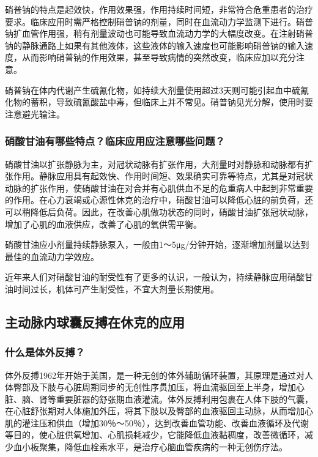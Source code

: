 硝普钠的特点是起效快，作用效果强，作用持续时间短，非常符合危重患者的治疗要求。临床应用时需严格控制硝普钠的剂量，同时在血流动力学监测下进行。硝普钠扩血管作用强，稍有剂量波动也可能导致血流动力学的大幅度改变。在注射硝普钠的静脉通路上如果有其他液体，这些液体的输入速度也可能影响硝普钠的输入速度，从而影响硝普钠的作用效果，甚至导致病情的突然改变，临床应加以充分注意。

硝普钠在体内代谢产生硫氰化物，如持续大剂量使用超过3天则可能引起血中硫氰化物的蓄积，导致硫氰酸盐中毒，但临床上并不常见。硝普钠见光分解，使用时要注意避光输注。

\subsubsection{硝酸甘油有哪些特点？临床应用应注意哪些问题？}

硝酸甘油以扩张静脉为主，对冠状动脉有扩张作用，大剂量时对静脉和动脉都有扩张作用。静脉应用具有起效快、作用时间短、效果确实可靠等特点，尤其是对冠状动脉的扩张作用，使硝酸甘油在对合并有心肌供血不足的危重病人中起到非常重要的作用。在心力衰竭或心源性休克的治疗中，硝酸甘油可以降低心脏的前负荷，还可以稍降低后负荷。因此，在改善心肌做功状态的同时，硝酸甘油扩张冠状动脉，增加了心肌的血液供应，改善了心肌的氧供需平衡。

硝酸甘油应小剂量持续静脉泵入，一般由1～5μg/分钟开始，逐渐增加剂量以达到最佳的血流动力学效应。

近年来人们对硝酸甘油的耐受性有了更多的认识，一般认为，持续静脉应用硝酸甘油时间过长，机体可产生耐受性，不宜大剂量长期使用。

\subsection{主动脉内球囊反搏在休克的应用}

\subsubsection{什么是体外反搏？}

体外反搏1962年开始于美国，是一种无创的体外辅助循环装置，其原理是通过对人体臀部及下肢与心脏周期同步的无创性序贯加压，将血流驱回至上半身，增加心脏、脑、肾等重要脏器的舒张期血液灌流。体外反搏利用包裹在人体下肢的气囊，在心脏舒张期对人体施加外压，将其下肢以及臀部的血液驱回主动脉，从而增加心肌的灌注压和供血（增加30％～50％），达到改善血管功能、改善血液循环及代谢等目的，使心脏供氧增加、心肌损耗减少，它能降低血液黏稠度，改善微循环，减少血小板聚集，降低血栓素水平，是治疗心脑血管疾病的一种无创伤疗法。

